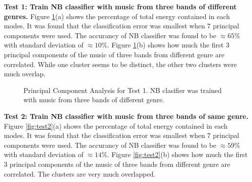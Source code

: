 \documentclass{article}
\begin{document}
\pagebreak
\textbf{Test 1: Train NB classifier with music from three bands of different genres.}
Figure \ref{fig:test1}(a) shows the percentage of total energy contained in each modes. It was found that the classification error was smallest when $7$ principal components were used. The accurancy of NB classifier was found to be $\approx 65 \%$ with standard deviation of $\approx 10 \%$. Figure \ref{fig:test1}(b) shows how much the first $3$ principal components of the music of three bands from different genre are correlated. While one cluster seems to be distinct, the other two clusters were much overlap. \\

\begin{figure}[!b]
\caption{Principal Component Analysis for Test 1. NB clasifier was trained with music from three bands of different genre.}
\label{fig:test1}
\end{figure}


\textbf{Test 2: Train NB classifier with music from three bands of same genre.}
Figure \ref{fig:test2}(a) shows the percentage of total energy contained in each modes. It was found that the classification error was smallest when $7$ principal components were used. The accurancy of NB classifier was found to be $\approx 59 \%$ with standard deviation of $\approx 14 \%$. Figure \ref{fig:test2}(b) shows how much the first $3$ principal components of the music of three bands from different genre are correlated. The clusters are very much overlapped. \\
\end{document}
